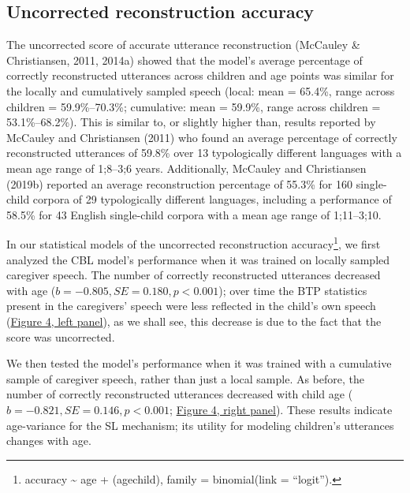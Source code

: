 \documentclass[
  english,
  man,floatsintext]{apa6}
\begin{document}
\hypertarget{uncorrected-reconstruction-accuracy}{%
\subsection{Uncorrected reconstruction accuracy}\label{uncorrected-reconstruction-accuracy}}

The uncorrected score of accurate utterance reconstruction (McCauley \& Christiansen, 2011, 2014a) showed that the model's average percentage of correctly reconstructed utterances across children and age points was similar for the locally and cumulatively sampled speech (local: mean = 65.4\%, range across children = 59.9\%--70.3\%; cumulative: mean = 59.9\%, range across children = 53.1\%--68.2\%). This is similar to, or slightly higher than, results reported by McCauley and Christiansen (2011) who found an average percentage of correctly reconstructed utterances of 59.8\% over 13 typologically different languages with a mean age range of 1;8--3;6 years. Additionally, McCauley and Christiansen (2019b) reported an average reconstruction percentage of 55.3\% for 160 single-child corpora of 29 typologically different languages, including a performance of 58.5\% for 43 English single-child corpora with a mean age range of 1;11--3;10.

In our statistical models of the uncorrected reconstruction accuracy\footnote{accuracy \textasciitilde{} age + (age\textbar child), family = binomial(link = \enquote{logit}).}, we first analyzed the CBL model's performance when it was trained on locally sampled caregiver speech. The number of correctly reconstructed utterances decreased with age (\(b = -0.805, SE = 0.180, p < 0.001\)); over time the BTP statistics present in the caregivers' speech were less reflected in the child's own speech (\protect\hyperlink{fig4}{Figure 4, left panel}), as we shall see, this decrease is due to the fact that the score was uncorrected.

We then tested the model's performance when it was trained with a cumulative sample of caregiver speech, rather than just a local sample. As before, the number of correctly reconstructed utterances decreased with child age (\(b=-0.821, SE = 0.146, p < 0.001\); \protect\hyperlink{fig4}{Figure 4, right panel}). These results indicate age-variance for the SL mechanism; its utility for modeling children's utterances changes with age.
\end{document}
